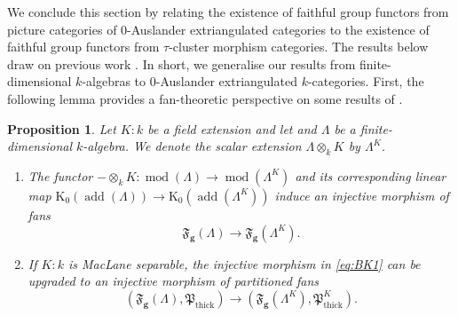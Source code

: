 \documentclass[10pt,twoside, a4paper,reqno]{amsart}
\DeclareMathOperator{\mods}{mod}
\DeclareMathOperator{\add}{add}
\DeclareMathOperator{\thick}{thick}
\newcommand{\partfan}[1]{\mathfrak{F}_{\bfg}(#1)}
\newcommand{\Pfrak}{\mathfrak{P}}
\newcommand{\K}{\mathrm{K}}
\newcommand{\bfg}{\mathbf{g}}
\newtheorem{proposition}[theorem]{Proposition}
\theoremstyle{definition}
\begin{document}
We conclude this section by relating the existence of faithful group functors from picture categories of 0-Auslander extriangulated categories to the existence of faithful group functors from $\tau$-cluster morphism categories. The results below draw on previous work \cite{BorveKaipeltautilt}. In short, we generalise our results from finite-dimensional $k$-algebras to 0-Auslander extriangulated $k$-categories. First, the following lemma provides a fan-theoretic perspective on some results of \cite{BorveKaipeltautilt}.

\begin{proposition}\label{prop:BK}
    Let $K:k$ be a field extension and let and $\Lambda$ be a finite-dimensional $k$-algebra. We denote the scalar extension $\Lambda\otimes_{k}K$ by  $\Lambda^K$.
    \begin{enumerate}
        \item\label{prop:BK1} The functor $- \otimes_k K\colon \mods(\Lambda)\xrightarrow{} \mods(\Lambda^K)$ and its corresponding linear map ${\K}_0(\add(\Lambda)) \to \K_0({\add}(\Lambda^K))$ induce a{n injective} morphism of fans
        \begin{equation}
            \label{eq:BK1}
            \partfan{\Lambda} \to \partfan{\Lambda^K}.
        \end{equation}
    \item\label{prop:BK2} If $K:k$ is MacLane separable, the injective morphism in \eqref{eq:BK1} can be upgraded to an injective morphism of partitioned fans
    \begin{equation}
            \label{eq:BK2}
            (\partfan{\Lambda}, \Pfrak_{\thick}) \to (\partfan{\Lambda^K}, \Pfrak_{\thick}^K).
        \end{equation}
    \end{enumerate}
\end{proposition}
\end{document}
